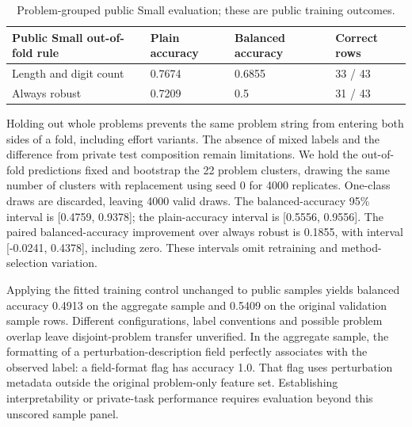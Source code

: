 \begin{table}[htbp]

\caption{Problem-grouped public Small evaluation; these are public training outcomes.}

\label{tab:6}

\small

\begin{tabularx}{\linewidth}{@{}YYYY@{}}

\toprule

\textbf{Public Small out-of-fold rule} & \textbf{Plain accuracy} & \textbf{Balanced accuracy} & \textbf{Correct rows} \\

\midrule

Length and digit count & 0.7674 & 0.6855 & 33 / 43 \\

Always robust & 0.7209 & 0.5 & 31 / 43 \\

\bottomrule

\end{tabularx}

\end{table}

Holding out whole problems prevents the same problem string from entering both sides of a fold, including effort variants. The absence of mixed labels and the difference from private test composition remain limitations. We hold the out-of-fold predictions fixed and bootstrap the 22 problem clusters, drawing the same number of clusters with replacement using seed 0 for 4000 replicates. One-class draws are discarded, leaving 4000 valid draws. The balanced-accuracy 95\% interval is [0.4759, 0.9378]; the plain-accuracy interval is [0.5556, 0.9556]. The paired balanced-accuracy improvement over always robust is 0.1855, with interval [-0.0241, 0.4378], including zero. These intervals omit retraining and method-selection variation.


Applying the fitted training control unchanged to public samples yields balanced accuracy 0.4913 on the aggregate sample and 0.5409 on the original validation sample rows. Different configurations, label conventions and possible problem overlap leave disjoint-problem transfer unverified. In the aggregate sample, the formatting of a perturbation-description field perfectly associates with the observed label: a field-format flag has accuracy 1.0. That flag uses perturbation metadata outside the original problem-only feature set. Establishing interpretability or private-task performance requires evaluation beyond this unscored sample panel. \citep{S3,S5}


